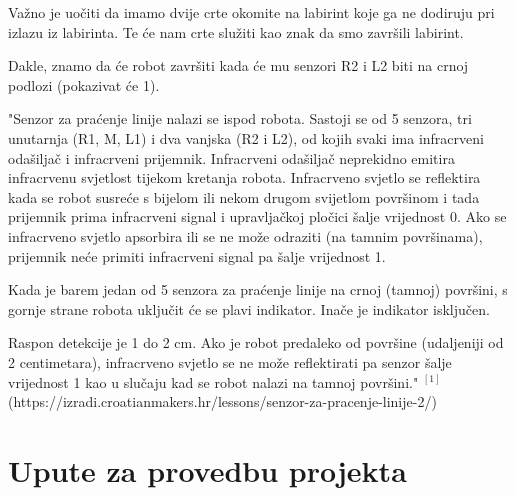 \vspace{3mm}

Važno je uočiti da imamo dvije crte okomite na labirint koje ga ne dodiruju pri izlazu iz labirinta. Te će nam crte služiti kao znak da smo završili labirint.

\vspace{3mm}

Dakle, znamo da će robot završiti kada će mu senzori R2 i L2 biti na crnoj podlozi (pokazivat će 1).

\vspace{3mm}



"Senzor za praćenje linije nalazi se ispod robota. Sastoji se od 5 senzora, tri unutarnja (R1, M, L1) i  dva vanjska (R2 i L2), od kojih svaki ima infracrveni odašiljač i infracrveni prijemnik. Infracrveni odašiljač neprekidno emitira infracrvenu svjetlost tijekom kretanja robota. Infracrveno svjetlo se reflektira kada se robot susreće s bijelom ili nekom drugom svijetlom površinom i tada prijemnik prima infracrveni signal i upravljačkoj pločici šalje vrijednost 0. Ako se infracrveno svjetlo apsorbira ili se ne može odraziti (na tamnim površinama), prijemnik neće primiti infracrveni signal pa šalje vrijednost 1.

Kada je barem jedan od 5 senzora za praćenje linije na crnoj (tamnoj) površini, s gornje strane robota uključit će se plavi indikator. Inače je indikator isključen.

Raspon detekcije je 1 do 2 cm. Ako je robot predaleko od površine (udaljeniji od 2 centimetara), infracrveno svjetlo se ne može reflektirati pa senzor šalje vrijednost 1 kao u slučaju kad se robot nalazi na tamnoj površini." $^{[1]}$ (https://izradi.croatianmakers.hr/lessons/senzor-za-pracenje-linije-2/)

\vspace{3mm}



\section{Upute za provedbu projekta}



